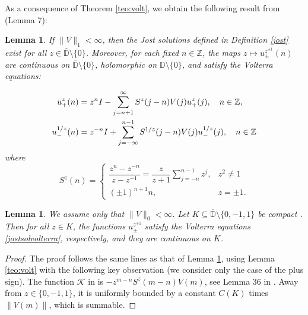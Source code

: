 \documentclass[12pt,oneside,onecolumn,open]{article}
\newtheorem{obs}[teo]{Remark}
\newtheorem{lema}[teo]{Lemma}
\begin{document}
As a consequence of Theorem \ref{teo:volt}, we obtain the following result from \cite{MR4385984} (Lemma 7):

\begin{lema}\label{jostvolterra}
    If \(\|V\|_1 < \infty\), then the Jost solutions defined in Definition \ref{jost} exist for all \(z \in \overline{\mathbb{D}}\setminus \{0\}\). Moreover, for each fixed \(n \in \mathbb{Z}\), the maps \(z \mapsto u_{\pm}^{z^{\pm 1}}(n)\) are continuous on \(\overline{\mathbb{D}}\setminus \{0\}\), holomorphic on \(\mathbb{D}\setminus \{0\}\), and satisfy the Volterra equations:

    \begin{align}\label{jostsolvolterra}
        u_+^z(n) &= z^n I - \sum_{j=n+1}^\infty S^z(j-n)V(j)u_+^z(j), \quad n \in \mathbb{Z},\\ \notag
        u_-^{1/z}(n) &= z^{-n} I + \sum_{j=-\infty}^{n-1} S^{1/z}(j-n)V(j)u_-^{1/z}(j), \quad n \in \mathbb{Z}
    \end{align}
    where
    \begin{equation}
\label{eq:scalar}
S^{z}(n) = \left\{ \begin{array}{lcc}
            \dfrac{z^{n}-z^{-n}}{z-z^{-1}} = \dfrac{z}{z+1}\sum_{j=-n}^{n-1} z^{j}, & z^{2} \neq 1 \\
            (\pm 1)^{n+1}n, & z = \pm 1.
            \end{array}
   \right.
   \end{equation}
\end{lema}

\begin{lema}\label{voltinK}
We assume only that $ \|  V\|_0 < \infty $. Let \(K \subseteq \overline{\mathbb{D}}\setminus \{0, -1, 1\}\) be compact . Then for all \(z \in K\), the functions \(u_{\pm}^{z^{\pm 1}}\) satisfy the Volterra equations \eqref{jostsolvolterra}, respectively, and they are continuous on \(K\).
\end{lema}

\begin{proof}
    The proof follows the same lines as that of Lemma \ref{jostvolterra}, using Lemma \ref{teo:volt} with the following key observation (we consider only the case of the plus sign).  The function $  \mathcal{K} $ in \cite{MR4385984} is 
    $-z^{m-n} S^{z}(m-n)  V(m)   $, see Lemma 36 in \cite{MR4385984}.  Away from $ z \in \{ 0, -1, 1 \}  $, it is uniformly bounded by a constant $C(K)$ times $ \|  V(m)\|$, which is summable.     
\end{proof}
\end{document}
